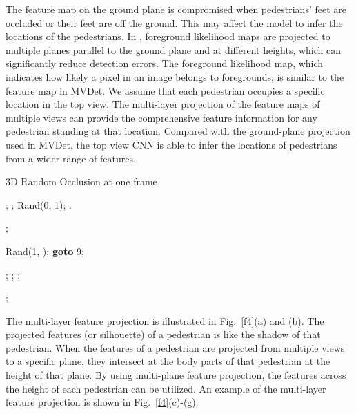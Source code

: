\documentclass[runningheads]{llncs}
\begin{document}
	The feature map on the ground plane is compromised when pedestrians' feet are occluded or their feet are off the ground. This may affect the model to infer the locations of the pedestrians. In \cite{khan2008tracking}, foreground likelihood maps are projected to multiple planes parallel to the ground plane and at different heights, which can significantly reduce detection errors. The foreground likelihood map, which indicates how likely a pixel in an image belongs to foregrounds, is similar to the feature map in MVDet. We assume that each pedestrian occupies a specific location in the top view. The multi-layer projection of the feature maps of multiple views can provide the comprehensive feature information for any pedestrian standing at that location. Compared with the ground-plane projection used in MVDet, the top view CNN is able to infer the locations of pedestrians from a wider range of features.
	\begin{center}
		\begin{minipage}[t]{10cm}
			\begin{algorithm}[H]
\caption{3D Random Occlusion at one frame}  \label{code:alg1}
				\DontPrintSemicolon
				; \;
				; \;
				 Rand(0, 1); \;
				\If{}
				{
					\Return .
				}
				\Else
				{ ; \;
					\While{}
					{
						 Rand(1, ); \;
						\If{}
						{
							\textbf{goto} 9; \;
						}
						\Else
						{
							{
								 ; \;
								{
									{
										;\;
									}
								}
							}
							;\;
							
						}
					}
					\Return ; \;}
\end{algorithm}
		\end{minipage}
	\end{center}
	
	The multi-layer feature projection is illustrated in Fig.~\ref{f4}(a) and (b). The projected features (or silhouette) of a pedestrian is like the shadow of that pedestrian. When the features of a pedestrian are projected from multiple views to a specific plane, they intersect at the body parts of that pedestrian at the height of that plane. By using multi-plane feature projection, the features across the height of each pedestrian can be utilized.
	An example of the multi-layer feature projection is shown in Fig.~\ref{f4}(c)-(g).
	
\end{document}
